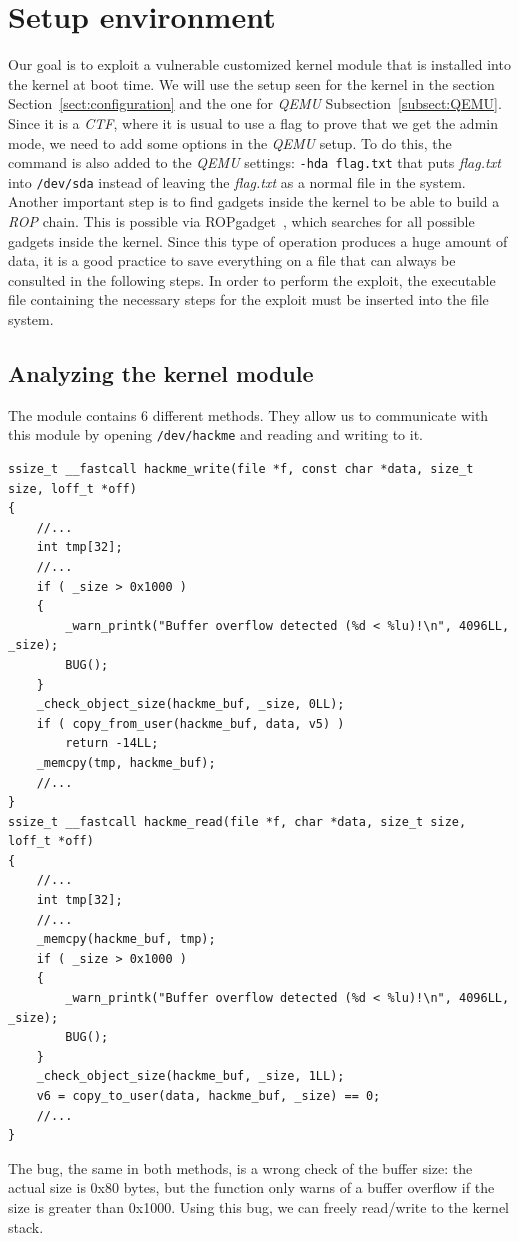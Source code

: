 \documentclass{masterthesis}
\newcommand{\refToSection}[1]{Section~\ref{sect:#1}\xspace}
\newcommand{\refToSubSection}[1]{Subsection~\ref{subsect:#1}\xspace}
\begin{document}
\section{Setup environment}
\label{sect:set-up}
Our goal is to exploit a vulnerable customized kernel module that is installed into the kernel at boot time.
We will use the setup seen for the kernel in the section \refToSection{configuration} and the one for \emph{QEMU} \refToSubSection{QEMU}.
Since it is a \emph{CTF}, where it is usual to use a flag to prove that we get the admin mode, we need to add some options in the \emph{QEMU} setup.
To do this, the command is also added to the \emph{QEMU} settings:
\lstinline{-hda flag.txt}
that puts \textit{flag.txt} into \texttt{/dev/sda} instead of leaving the \textit{flag.txt} as a normal file in the system.
Another important step is to find gadgets inside the kernel to be able to build a \emph{ROP} chain.
This is possible via ROPgadget~\cite{rop_gadget}, which searches for all possible gadgets inside the kernel.
Since this type of operation produces a huge amount of data, it is a good practice to save everything on a file that can always be consulted in the following steps.
In order to perform the exploit, the executable file containing the necessary steps for the exploit must be inserted into the file system.
\subsection{Analyzing the kernel module}
\label{subsect:hackme}
The module contains 6 different methods.
They allow us to communicate with this module by opening \lstinline{/dev/hackme} and reading and writing to it.
\begin{lstlisting}
ssize_t __fastcall hackme_write(file *f, const char *data, size_t size, loff_t *off)
{
    //...
    int tmp[32];
    //...
    if ( _size > 0x1000 )
    {
        _warn_printk("Buffer overflow detected (%d < %lu)!\n", 4096LL, _size);
        BUG();
    }
    _check_object_size(hackme_buf, _size, 0LL);
    if ( copy_from_user(hackme_buf, data, v5) )
        return -14LL;
    _memcpy(tmp, hackme_buf);
    //...
}
ssize_t __fastcall hackme_read(file *f, char *data, size_t size, loff_t *off)
{
    //...
    int tmp[32];
    //...
    _memcpy(hackme_buf, tmp);
    if ( _size > 0x1000 )
    {
        _warn_printk("Buffer overflow detected (%d < %lu)!\n", 4096LL, _size);
        BUG();
    }
    _check_object_size(hackme_buf, _size, 1LL);
    v6 = copy_to_user(data, hackme_buf, _size) == 0;
    //...
}
\end{lstlisting}
The bug, the same in both methods, is a wrong check of the buffer size: the actual size is 0x80 bytes, but the function only warns of a buffer overflow if the size is greater than 0x1000. Using this bug, we can freely read/write to the kernel stack.
\end{document}

